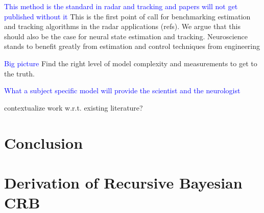 \documentclass{article}
\newcommand{\brian}[1]{\textcolor{blue}{#1}}
\begin{document}
\brian{This method is the standard in radar and tracking and papers will not get published without it}
This is the first point of call for benchmarking estimation and tracking algorithms in the radar applications (refs). We argue that this should also be the case for neural state estimation and tracking. Neuroscience stands to benefit greatly from estimation and control techniques from engineering

\brian{Big picture}
Find the right level of model complexity and measurements to get to the truth.

\brian{What a subject specific model will provide the scientist and the neurologist}

contextualize work w.r.t. existing literature?


\section{Conclusion}

\appendix
\section{Derivation of Recursive Bayesian CRB}\label{sec:derivation_recursion}
\end{document}
